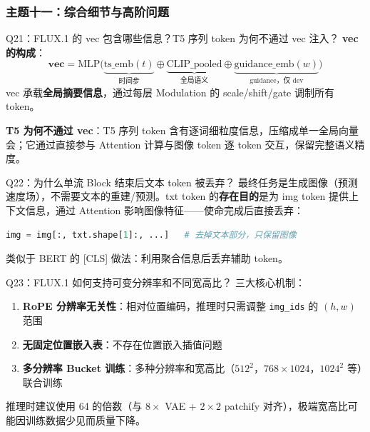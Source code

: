 \subsubsection{主题十一：综合细节与高阶问题}

\begin{conceptbox}{Q21：FLUX.1 的 vec 包含哪些信息？T5 序列 token 为何不通过 vec 注入？}
\textbf{vec 的构成}：
\[
\mathbf{vec} = \text{MLP}\bigl(\underbrace{\text{ts\_emb}(t)}_{\text{时间步}} \oplus \underbrace{\text{CLIP\_pooled}}_{\text{全局语义}} \oplus \underbrace{\text{guidance\_emb}(w)}_{\text{guidance，仅 dev}}\bigr)
\]
vec 承载\textbf{全局摘要信息}，通过每层 Modulation 的 scale/shift/gate 调制所有 token。

\textbf{T5 为何不通过 vec}：T5 序列 token 含有逐词细粒度信息，压缩成单一全局向量会；它通过直接参与 Attention 计算与图像 token 逐 token 交互，保留完整语义精度。
\end{conceptbox}

\begin{conceptbox}{Q22：为什么单流 Block 结束后文本 token 被丢弃？}
最终任务是生成图像（预测速度场），不需要文本的重建/预测。txt token 的\textbf{存在目的}是为 img token 提供上下文信息，通过 Attention 影响图像特征——使命完成后直接丢弃：
\begin{lstlisting}[language=Python]
img = img[:, txt.shape[1]:, ...]   # 去掉文本部分，只保留图像
\end{lstlisting}
类似于 BERT 的 [CLS] 做法：利用聚合信息后丢弃辅助 token。
\end{conceptbox}

\begin{conceptbox}{Q23：FLUX.1 如何支持可变分辨率和不同宽高比？}
三大核心机制：
\begin{enumerate}
  \item \textbf{RoPE 分辨率无关性}：相对位置编码，推理时只需调整 \texttt{img\_ids} 的 $(h,w)$ 范围
  \item \textbf{无固定位置嵌入表}：不存在位置嵌入插值问题
  \item \textbf{多分辨率 Bucket 训练}：多种分辨率和宽高比（$512^2$，$768\times1024$，$1024^2$ 等）联合训练
\end{enumerate}

推理时建议使用 64 的倍数（与 $8\times$ VAE + $2\times2$ patchify 对齐），极端宽高比可能因训练数据少见而质量下降。
\end{conceptbox}

